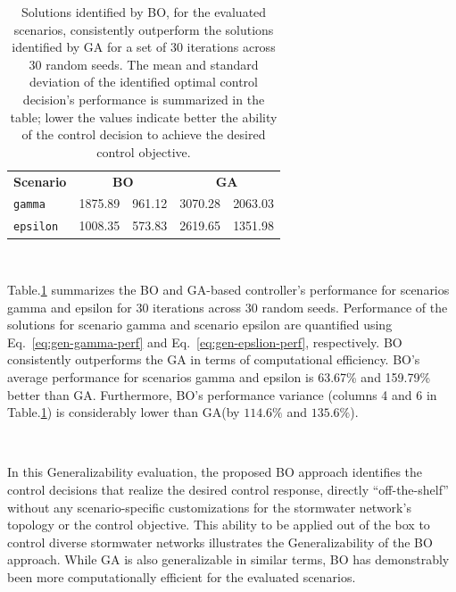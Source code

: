 \begin{table}
\caption{Solutions identified by BO, for the evaluated scenarios, consistently outperform the solutions identified by GA for a set of 30 iterations across 30 random seeds.
The mean and standard deviation of the identified optimal control decision's performance is summarized in the table; lower the values indicate better the ability of the control decision to achieve the desired control objective.
}\label{tab:boga}
\begin{tabular}{p{0.5in}p{0.5in}p{0.5in}p{0.5in}p{0.5in}}
\toprule
\multirow{3}{*}{\textbf{Scenario}} & \multicolumn{2}{c}{\multirow{3}{*}{\textbf{BO}}} & \multicolumn{2}{c}{\multirow{3}{*}{\textbf{GA}}} \\
&    &  &  &   \\
&   $\mu$ & $\sigma$ & $\mu$ &  $\sigma$ \\ \midrule
\texttt{gamma}   & 1875.89 & 961.12 & 3070.28 & 2063.03 \\\midrule
\texttt{epsilon}  & 1008.35 & 573.83 & 2619.65 & 1351.98 \\
\bottomrule
\end{tabular}
\end{table}

\

Table.\ref{tab:boga} summarizes the BO and GA-based controller's performance for scenarios gamma and epsilon for 30 iterations across 30 random seeds.
Performance of the solutions for scenario gamma and scenario epsilon are quantified using Eq.~\ref{eq:gen-gamma-perf} and Eq.~\ref{eq:gen-epslion-perf}, respectively.
BO consistently outperforms the GA in terms of computational efficiency.
BO's average performance for scenarios gamma and epsilon is 63.67\% and 159.79\% better than GA\@. 
Furthermore, BO's performance variance (columns 4 and 6 in Table.\ref{tab:boga}) is considerably lower than GA(by $114.6\%$ and $135.6\%$).

\

In this Generalizability evaluation, the proposed BO approach identifies the control decisions that realize the desired control response, directly ``off-the-shelf'' without any scenario-specific customizations for the stormwater network's topology or the control objective.
This ability to be applied out of the box to control diverse stormwater networks illustrates the Generalizability of the BO approach.
While GA is also generalizable in similar terms, BO has demonstrably been more computationally efficient for the evaluated scenarios. 


